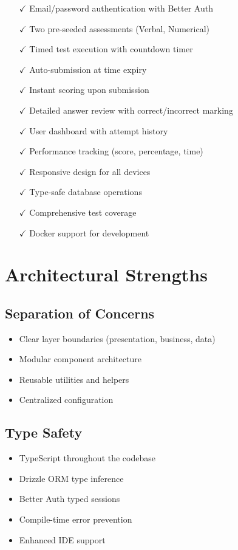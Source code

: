 \documentclass[12pt,a4paper]{report}
\begin{document}
\begin{itemize}
    \item[$\checkmark$] Email/password authentication with Better Auth
    \item[$\checkmark$] Two pre-seeded assessments (Verbal, Numerical)
    \item[$\checkmark$] Timed test execution with countdown timer
    \item[$\checkmark$] Auto-submission at time expiry
    \item[$\checkmark$] Instant scoring upon submission
    \item[$\checkmark$] Detailed answer review with correct/incorrect marking
    \item[$\checkmark$] User dashboard with attempt history
    \item[$\checkmark$] Performance tracking (score, percentage, time)
    \item[$\checkmark$] Responsive design for all devices
    \item[$\checkmark$] Type-safe database operations
    \item[$\checkmark$] Comprehensive test coverage
    \item[$\checkmark$] Docker support for development
\end{itemize}

\section{Architectural Strengths}

\subsection{Separation of Concerns}

\begin{itemize}
    \item Clear layer boundaries (presentation, business, data)
    \item Modular component architecture
    \item Reusable utilities and helpers
    \item Centralized configuration
\end{itemize}

\subsection{Type Safety}

\begin{itemize}
    \item TypeScript throughout the codebase
    \item Drizzle ORM type inference
    \item Better Auth typed sessions
    \item Compile-time error prevention
    \item Enhanced IDE support
\end{itemize}
\end{document}
